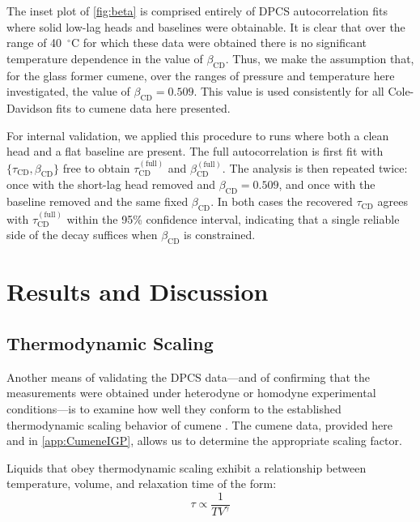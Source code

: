 The inset plot of \fig \ref{fig:beta} is comprised entirely of DPCS autocorrelation fits where solid low-lag heads and baselines were obtainable.  It is clear that over the range of 40~$^\circ$C for which these data were obtained there is no significant temperature dependence in the value of  $\beta_{\mathrm{CD}}$.  Thus, we make the assumption that, for the glass former cumene, over the ranges of pressure and temperature here investigated, the value of  $\beta_{\mathrm{CD}}=0.509$.  This value is used consistently for all Cole-Davidson fits to cumene data here presented.

For internal validation, we applied this procedure to runs where both a clean head and a flat baseline are present. The full autocorrelation is first fit with $\{\tau_{\mathrm{CD}},\beta_{\mathrm{CD}}\}$ free to obtain $\tau_{\mathrm{CD}}^{(\text{full})}$ and $\beta_{\mathrm{CD}}^{(\text{full})}$. The analysis is then repeated twice: once with the short-lag head removed and $\beta_{\mathrm{CD}}=0.509$, and once with the baseline removed and the same fixed $\beta_{\mathrm{CD}}$. In both cases the recovered $\tau_{\mathrm{CD}}$ agrees with $\tau_{\mathrm{CD}}^{(\text{full})}$ within the 95\% confidence interval, indicating that a single reliable side of the decay suffices when $\beta_{\mathrm{CD}}$ is constrained. 


\section{Results and Discussion}\label{sec:result}
\subsection{Thermodynamic Scaling}\label{sec:tdscaling}

Another means of validating the DPCS data—and of confirming that the measurements were obtained under heterodyne or homodyne experimental conditions—is to examine how well they conform to the established thermodynamic scaling behavior of cumene \cite{RansomPRL}. The cumene \tgp data, provided here and in \app \ref{app:CumeneIGP}, allows us to determine the appropriate scaling factor.  

Liquids that obey thermodynamic scaling exhibit a relationship between temperature, volume, and relaxation time of the form:  
\begin{equation}\label{eqn:tdscaling}
	\tau \propto \frac{1}{T V^{\gamma}}
\end{equation}

